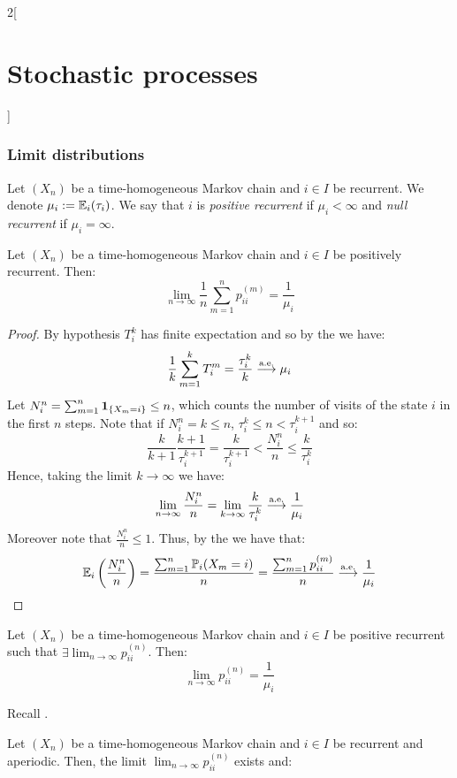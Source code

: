 \documentclass[../../../main_math.tex]{subfiles}
\begin{document}
\begin{multicols}{2}[\section{Stochastic processes}]
  \subsubsection{Limit distributions}
  \begin{definition}
    Let $(X_n)$ be a time-homogeneous Markov chain and $i\in I$ be recurrent. We denote $\mu_i:=\mathbb{E}_i(\tau_i)$. We say that $i$ is \emph{positive recurrent} if $\mu_i<\infty$ and \emph{null recurrent} if $\mu_i=\infty$.
  \end{definition}
  \begin{theorem}
    Let $(X_n)$ be a time-homogeneous Markov chain and $i\in I$ be positively recurrent. Then:
    $$
      \lim_{n\to\infty}\frac{1}{n}\sum_{m=1}^n p_{ii}^{(m)}=\frac{1}{\mu_i}
    $$
  \end{theorem}
  \begin{proof}
    By hypothesis $T_i^k$ has finite expectation and so by the  we have:
    $$\frac{1}{k}\sum_{m=1}^{k}T_i^m=\frac{\tau_i^k}{k}\overset{\text{a.e.}}{\longrightarrow}\mu_i$$
    Let $N_i^n=\sum_{m=1}^n\boldsymbol{\mathrm{1}}_{\{X_m=i\}}\leq n$, which counts the number of visits of the state $i$ in the first $n$ steps. Note that if $N_i^n=k\leq n$, $\tau_i^k\leq n<\tau_i^{k+1}$ and so:
    $$
      \frac{k}{k+1}\frac{k+1}{\tau_i^{k+1}}=\frac{k}{\tau_i^{k+1}}<\frac{N_i^n}{n}\leq \frac{k}{\tau_i^k}
    $$
    Hence, taking the limit $k\to\infty$ we have: $$\displaystyle\lim_{n\to\infty}\frac{N_i^n}{n}=\lim_{k\to\infty}\frac{k}{\tau_i^k}\overset{\text{a.e.}}{\longrightarrow}\frac{1}{\mu_i}$$ Moreover note that $\frac{N_i^n}{n}\leq 1$. Thus, by the  we have that:
    $$
      \mathbb{E}_i\left(\frac{N_i^n}{n}\right)=\frac{\sum_{m=1}^n \mathbb{P}_i(X_m=i)}{n}=\frac{\sum_{m=1}^n p_{ii}^{(m)}}{n}\overset{\text{a.e.}}{\longrightarrow}\frac{1}{\mu_i}
    $$
  \end{proof}
  \begin{corollary}
    Let $(X_n)$ be a time-homogeneous Markov chain and $i\in I$ be positive recurrent such that $\displaystyle\exists\lim_{n\to\infty}p_{ii}^{(n)}$. Then:
    $$
      \lim_{n\to\infty} p_{ii}^{(n)}=\frac{1}{\mu_i}
    $$
  \end{corollary}
  \begin{sproof}
    Recall .
  \end{sproof}
  \begin{theorem}\label{SP:ergotic2}
    Let $(X_n)$ be a time-homogeneous Markov chain and $i\in I$ be recurrent and aperiodic. Then, the limit $\displaystyle\lim_{n\to\infty}p_{ii}^{(n)}$ exists and:

\end{theorem}
\end{multicols}
\end{document}
